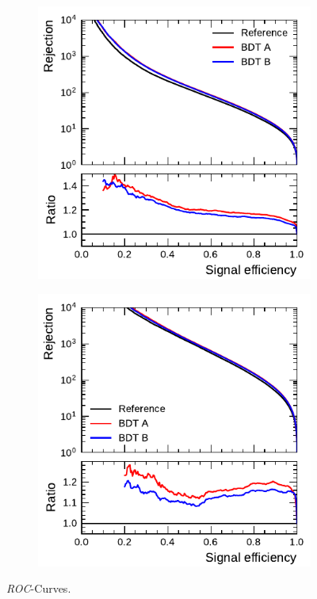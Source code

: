 \begin{figure}[ht]
  \begin{subfigure}[t]{0.48\textwidth}
    \centering
    \includegraphics{./figures/bdt_perf/roc/bdt_1p_comparison.pdf}
    \label{fig:bdt_1p_roc}
  \end{subfigure}\hfill
  \begin{subfigure}[t]{0.48\textwidth}
    \centering
    \includegraphics{./figures/bdt_perf/roc/bdt_3p_comparison.pdf}
    \label{fig:bdt_3p_roc}
  \end{subfigure}
  \caption{\emph{ROC}-Curves. }
\end{figure}

